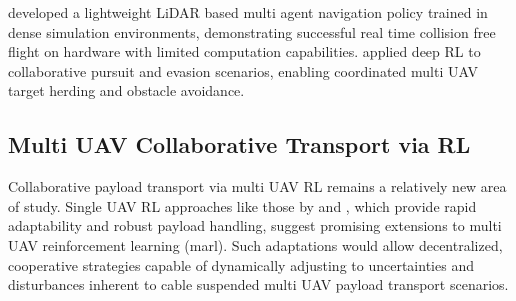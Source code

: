 \cite{diao_efficient_2024} developed a lightweight LiDAR based multi agent navigation policy trained in dense simulation environments, demonstrating successful real time collision free flight on hardware with limited computation capabilities. \cite{zhao_deep_2024} applied deep RL to collaborative pursuit and evasion scenarios, enabling coordinated multi UAV target herding and obstacle avoidance.

\subsection{Multi UAV Collaborative Transport via RL}
Collaborative payload transport via multi UAV RL remains a relatively new area of study. Single UAV RL approaches like those by \cite{belkhale_model-based_2021} and \cite{hua_new_2022}, which provide rapid adaptability and robust payload handling, suggest promising extensions to multi UAV reinforcement learning (\gls{marl}). Such adaptations would allow decentralized, cooperative strategies capable of dynamically adjusting to uncertainties and disturbances inherent to cable suspended multi UAV payload transport scenarios.